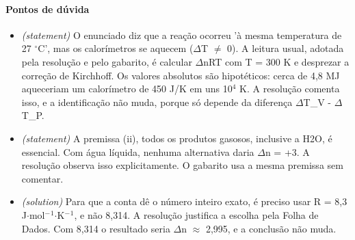 \documentclass{article}%
\begin{document}
\paragraph{Pontos de dúvida}%
\begin{itemize}%
\item%
\textit{(statement)} O enunciado diz que a reação ocorreu 'à mesma temperatura de 27 $^\circ$C', mas os calorímetros se aquecem ($\Delta$T $\neq$ 0). A leitura usual, adotada pela resolução e pelo gabarito, é calcular $\Delta$nRT com T = 300 K e desprezar a correção de Kirchhoff. Os valores absolutos são hipotéticos: cerca de 4,8 MJ aqueceriam um calorímetro de 450 J/K em uns 10$^{4}$ K. A resolução comenta isso, e a identificação não muda, porque só depende da diferença $\Delta$T\_V - $\Delta$T\_P.%
\item%
\textit{(statement)} A premissa (ii), todos os produtos gasosos, inclusive a H2O, é essencial. Com água líquida, nenhuma alternativa daria $\Delta$n = +3. A resolução observa isso explicitamente. O gabarito usa a mesma premissa sem comentar.%
\item%
\textit{(solution)} Para que a conta dê o número inteiro exato, é preciso usar R = 8,3 J$\cdot$mol$^{-}$$^{1}$$\cdot$K$^{-}$$^{1}$, e não 8,314. A resolução justifica a escolha pela Folha de Dados. Com 8,314 o resultado seria $\Delta$n $\approx$ 2,995, e a conclusão não muda.%
\end{itemize}%
\end{document}
